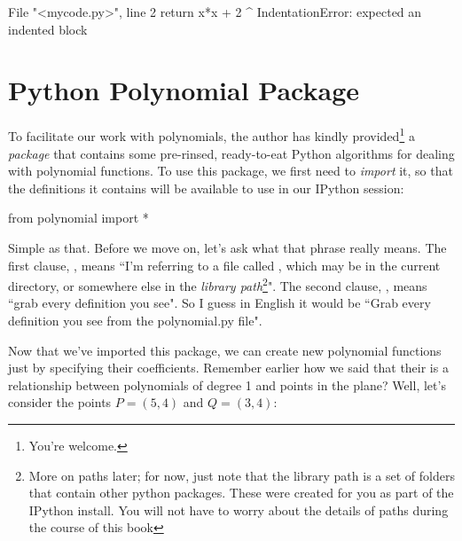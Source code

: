 \begin{python}
  File "<mycode.py>", line 2
    return x*x + 2
         ^
IndentationError: expected an indented block
\end{python}

\section{Python Polynomial Package}
To facilitate our work with polynomials, the author has kindly provided\footnote{You're welcome.} a \emph{package} that contains some pre-rinsed, ready-to-eat Python algorithms for dealing with polynomial functions. To use this package, we first need to \emph{import} it, so that the definitions it contains will be available to use in our IPython session:

\begin{python}
from polynomial import *
\end{python}

Simple as that. Before we move on, let's ask what that phrase really means. The first clause, , means ``I'm referring to a file called , which may be in the current directory, or somewhere else in the \emph{library path}\footnote{More on paths later; for now, just note that the library path is a set of folders that contain other python packages. These were created for you as part of the IPython install. You will not have to worry about the details of paths during the course of this book}". The second clause, , means ``grab every definition you see". So I guess in English it would be ``Grab every definition you see from the polynomial.py file".

Now that we've imported this package, we can create new polynomial functions just by specifying their coefficients. Remember earlier how we said that their is a relationship between polynomials of degree 1 and points in the plane? Well, let's consider the points $P = (5,4)$ and $Q = (3,4)$:


